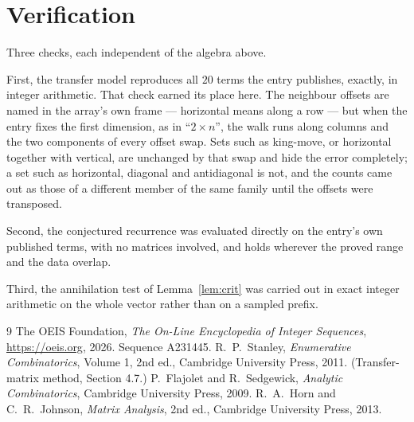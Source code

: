 \documentclass[11pt,a4paper]{article}
\theoremstyle{plain}
\theoremstyle{definition}
\begin{document}
\section{Verification}

Three checks, each independent of the algebra above.

First, the transfer model reproduces all $20$ terms the entry publishes, exactly, in
integer arithmetic. That check earned its place here. The neighbour offsets are named in the
array's own frame --- horizontal means along a row --- but when the entry fixes the first
dimension, as in ``$2\times n$'', the walk runs along columns and the two components of every
offset swap. Sets such as king-move, or horizontal together with vertical, are unchanged by
that swap and hide the error completely; a set such as horizontal, diagonal and antidiagonal
is not, and the counts came out as those of a different member of the same family until the
offsets were transposed.

Second, the conjectured recurrence was evaluated directly on the entry's own published terms,
with no matrices involved, and holds wherever the proved range and the data overlap.

Third, the annihilation test of Lemma~\ref{lem:crit} was carried out in exact integer
arithmetic on the whole vector rather than on a sampled prefix.

\begin{thebibliography}{9}
 The OEIS Foundation, \emph{The On-Line Encyclopedia of Integer
Sequences}, \url{https://oeis.org}, 2026. Sequence A231445.
 R.~P.~Stanley, \emph{Enumerative Combinatorics}, Volume 1, 2nd ed.,
Cambridge University Press, 2011. (Transfer-matrix method, Section 4.7.)
 P.~Flajolet and R.~Sedgewick, \emph{Analytic Combinatorics}, Cambridge
University Press, 2009.
 R.~A.~Horn and C.~R.~Johnson, \emph{Matrix Analysis}, 2nd ed., Cambridge
University Press, 2013.
\end{thebibliography}
\end{document}
